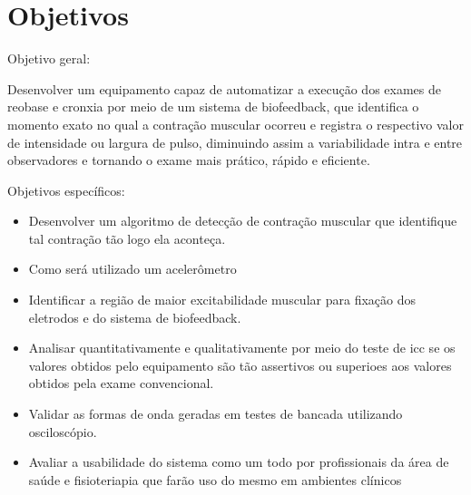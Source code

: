 \section{Objetivos}

Objetivo geral:

Desenvolver um equipamento capaz de automatizar a execução dos exames de reobase e cronxia por meio de um sistema de biofeedback, que identifica o momento exato no qual a contração muscular ocorreu e registra o respectivo valor de intensidade ou largura de pulso, diminuindo assim a variabilidade intra e entre observadores e tornando o exame mais prático, rápido e eficiente.

Objetivos específicos:

\begin{itemize}
    \item Desenvolver um algoritmo de detecção de contração muscular que identifique tal contração tão logo ela aconteça.
    \item Como será utilizado um acelerômetro 
    \item Identificar a região de maior excitabilidade muscular para fixação dos eletrodos e do sistema de biofeedback.
    \item Analisar quantitativamente e qualitativamente por meio do teste de \ac{icc} se os valores obtidos pelo equipamento são tão assertivos ou superioes aos valores obtidos pela exame convencional.
    \item Validar as formas de onda geradas em testes de bancada utilizando osciloscópio.
    \item Avaliar a usabilidade do sistema como um todo por profissionais da área de saúde e fisioteriapia que farão uso do mesmo em ambientes clínicos
\end{itemize}